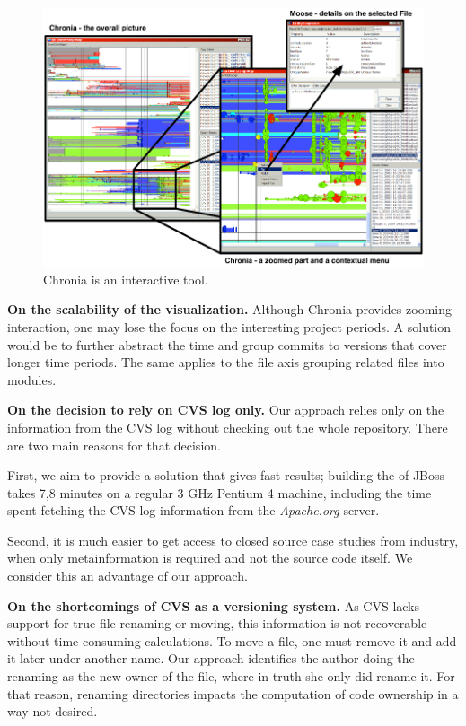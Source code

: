 \begin{figure}[htbp]
\begin{center}
\includegraphics[width=\linewidth]{fig/chronia-screenshot}
\caption{Chronia is an interactive tool.}
\label{fig:chronia}
\end{center}
\end{figure}

\textbf{On the scalability of the visualization.} Although Chronia provides zooming interaction, one may lose the focus on the interesting project periods. A solution would be to further abstract the time and group commits to versions that cover longer time periods. The same applies to the file axis grouping related files into modules.

\textbf{On the decision to rely on CVS log only.} Our approach relies only on the information from the CVS log without checking out the whole repository. There are two main reasons for that decision.

First, we aim to provide a solution that gives fast results; \eg building the \omap of JBoss takes 7,8 minutes on a regular 3 GHz Pentium 4 machine, including the time spent fetching the CVS log information from the \textit{Apache.org} server.

Second, it is much easier to get access to closed source case studies from industry, when only metainformation is required and not the source code itself. We consider this an advantage of our approach.

\textbf{On the shortcomings of CVS as a versioning system.} As CVS lacks support for true file renaming or moving, this information is not recoverable without time consuming calculations. To move a file, one must remove it and add it later under another name. Our approach identifies the author doing the renaming as the new owner of the file, where in truth she only did rename it. For that reason, renaming directories impacts the computation of code ownership in a way not desired.

